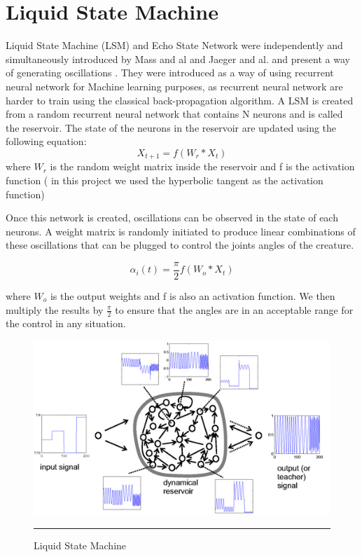 \section{Liquid State Machine}

Liquid State Machine (LSM) and Echo State Network were independently and simultaneously introduced by Mass and al \cite{liquidstatemachine} and Jaeger and al. \cite{echostatejaeger} and present a way of generating oscillations \cite{echostate}. They were introduced as a way of using recurrent neural network for Machine learning purposes, as recurrent neural network are harder to train using the classical back-propagation algorithm. A LSM is created from a random recurrent neural network that contains N neurons and is called the reservoir. The state of the neurons in the reservoir are updated using the following equation: 
\begin{equation*}
    X_{t + 1} = f( W_r * X_{t})
\end{equation*}
 where $W_r$ is the random weight matrix inside the reservoir and f is the activation function ( in this project we used the hyperbolic tangent as the activation function)

Once this network is created, oscillations can be observed in the state of each neurons. A weight matrix is randomly initiated to produce linear combinations of these oscillations that can be plugged to control the joints angles of the creature.

\begin{equation*}
    \alpha_i(t) = \frac{\pi}{2} f( W_o * X_{t})
\end{equation*}

where $W_o$ is the output weights and f is also an activation function. We then multiply the results by $\frac{\pi}{2}$ to ensure that the angles are in an acceptable range for the control in any situation.

\begin{figure}[htbp]
    \centering
    \includegraphics[scale=3.0]{Figures/echo_state.png}
    \rule{35em}{0.5pt}
    \caption[Liquid State Machine]{Liquid State Machine}
    \label{fig:echo_state}
\end{figure}


